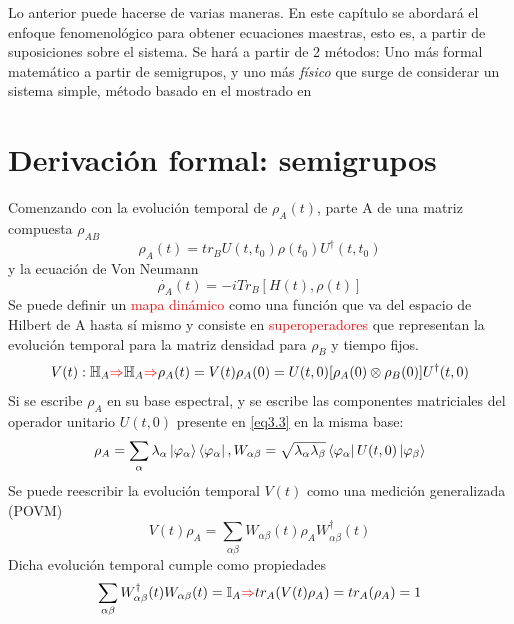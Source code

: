 \documentclass{book}
\begin{document}
Lo anterior puede hacerse de varias maneras. En este capítulo se abordará el enfoque fenomenológico para obtener ecuaciones maestras, esto es, a partir de suposiciones sobre el sistema. Se hará a partir de 2 métodos: Uno más formal matemático a partir de semigrupos, y uno más \textit{físico} que surge de considerar un sistema simple, método basado en el mostrado en \cite{Orszag}
\section{Derivación formal: semigrupos}
Comenzando con la evolución temporal de $\rho_A(t)$, parte A de una matriz compuesta $\rho_{AB}$
\begin{equation}\label{eq3.1}\rho_A(t)=tr_B{U(t,t_0)\rho(t_0)U^\dag(t,t_0)}\end{equation}
y la ecuación de Von Neumann 
\begin{equation}\label{eq3.2}\dot{\rho_A}(t)=-iTr_B[H(t),\rho(t)]\end{equation}
Se puede definir un \textcolor{Red}{mapa dinámico} como una función que va del espacio de Hilbert de A hasta sí mismo y consiste en \textcolor{Red}{superoperadores} que representan la evolución temporal para la matriz densidad para $\rho_B$ y tiempo fijos.
\begin{equation}\label{eq3.3}V(t):\mathbb{H}_A\textcolor{red}{\Rightarrow}\mathbb{H}_A\textcolor{red}{\Rightarrow} \rho_A(t)=V(t)\rho_A(0)=U(t,0)[\rho_A(0)\otimes\rho_B(0)]U^\dag(t,0) \end{equation}
Si se escribe $\rho_A$ en su base espectral, y se escribe las componentes matriciales del operador unitario $U(t,0)$ presente en \textcolor{blue}{\ref{eq3.3}} en la misma base:
\begin{equation}\label{eq3.4}\rho_A=\sum_\alpha\lambda_\alpha\ket{\varphi_\alpha}\bra{\varphi_\alpha}, W_{\alpha\beta}=\sqrt{\lambda_\alpha\lambda_\beta}\bra{\varphi_\alpha}U(t,0)\ket{\varphi_\beta}\end{equation}
Se puede reescribir la evolución temporal $V(t)$ como una medición generalizada (POVM)
\begin{equation}\label{eq3.5}V(t)\rho_A=\sum_{\alpha\beta}W_{\alpha\beta}(t)\rho_AW^\dag_{\alpha\beta}(t)\end{equation}
Dicha evolución temporal cumple como propiedades
\begin{equation}\label{eq3.6} \sum_{\alpha\beta}W_{\alpha\beta}^\dag(t)W_{\alpha\beta}(t)=\mathbb{I}_A\textcolor{red}{\Rightarrow} tr_A(V(t)\rho_A)=tr_A(\rho_A)=1\end{equation}
\end{document}
